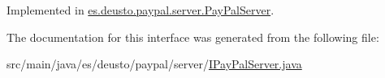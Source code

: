 Implemented in \mbox{\hyperlink{classes_1_1deusto_1_1paypal_1_1server_1_1_pay_pal_server_a3043b77ba4e3b895209cf5f71a52294a}{es.\+deusto.\+paypal.\+server.\+Pay\+Pal\+Server}}.



The documentation for this interface was generated from the following file\+:\begin{DoxyCompactItemize}
\item 
src/main/java/es/deusto/paypal/server/\mbox{\hyperlink{_i_pay_pal_server_8java}{I\+Pay\+Pal\+Server.\+java}}\end{DoxyCompactItemize}
